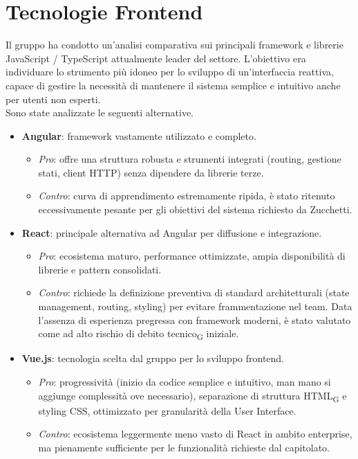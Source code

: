 \section{Tecnologie Frontend}
Il gruppo ha condotto un'analisi comparativa sui principali framework e librerie JavaScript / TypeScript attualmente leader del settore. L'obiettivo era individuare lo strumento più idoneo per lo sviluppo di un'interfaccia reattiva, capace di gestire la necessità di mantenere il sistema semplice e intuitivo anche per utenti non esperti. \\
Sono state analizzate le seguenti alternative.
\begin{itemize}
    \item \textbf{Angular}: framework vastamente utilizzato e completo.
        \begin{itemize}
            \item \textit{Pro}: offre una struttura robusta e strumenti integrati (routing, gestione stati, client HTTP) senza dipendere da librerie terze.
            \item \textit{Contro}: curva di apprendimento estremamente ripida, è stato ritenuto eccessivamente pesante per gli obiettivi del sistema richiesto da Zucchetti.
        \end{itemize}
    \item \textbf{React}: principale alternativa ad Angular per diffusione e integrazione.
        \begin{itemize}
            \item \textit{Pro}: ecosistema maturo, performance ottimizzate, ampia disponibilità di librerie e pattern consolidati.
            \item \textit{Contro}: richiede la definizione preventiva di standard architetturali (state management, routing, styling) per evitare frammentazione nel team. Data l'assenza di esperienza pregressa con framework moderni, è stato valutato come ad alto rischio di debito tecnico\textsubscript{G} iniziale.
        \end{itemize}
    \item \textbf{Vue.js}: tecnologia scelta dal gruppo per lo sviluppo frontend.
        \begin{itemize}
            \item \textit{Pro}: progressività (inizio da codice semplice e intuitivo, man mano si aggiunge complessità ove necessario), separazione di struttura HTML\textsubscript{G} e styling CSS, ottimizzato per granularità della User Interface.
            \item \textit{Contro}: ecosistema leggermente meno vasto di React in ambito enterprise, ma pienamente sufficiente per le funzionalità richieste dal capitolato.
        \end{itemize}
\end{itemize}

